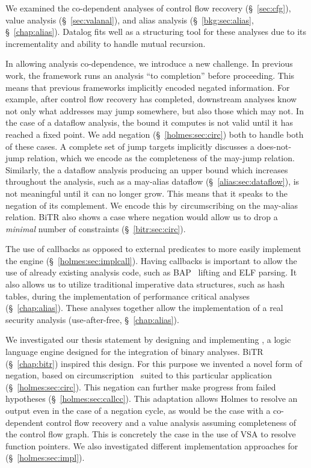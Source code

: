 We examined the co-dependent analyses of control flow recovery (\S~\ref{sec:cfg}), value analysis (\S~\ref{sec:valanal}), and alias analysis (\S~\ref{bkg:sec:alias}, \S~\ref{chap:alias}).
Datalog fits well as a structuring tool for these analyses due to its incrementality and ability to handle mutual recursion.


In allowing analysis co-dependence, we introduce a new challenge.
In previous work, the framework runs an analysis ``to completion'' before proceeding.
This means that previous frameworks implicitly encoded negated information.
For example, after control flow recovery has completed, downstream analyses know not only what addresses may jump somewhere, but also those which may not.
In the case of a dataflow analysis, the bound it computes is not valid until it has reached a fixed point.
We add negation (\S~\ref{holmes:sec:circ}) both to handle both of these cases.
A complete set of jump targets implicitly discusses a does-not-jump relation, which we encode as the completeness of the may-jump relation.
Similarly, the a dataflow analysis producing an upper bound which increases throughout the analysis, such as a may-alias dataflow (\S~\ref{alias:sec:dataflow}), is not meaningful until it can no longer grow.
This means that it speaks to the negation of its complement.
We encode this by circumscribing on the may-alias relation.
{\sc BiTR} also shows a case where negation would allow us to drop a \emph{minimal} number of constraints (\S~\ref{bitr:sec:circ}).

The use of callbacks as opposed to external predicates to more easily implement the engine (\S~\ref{holmes:sec:implcall}).
Having callbacks is important to allow the use of already existing analysis code, such as BAP~\cite{bap} lifting and ELF parsing.
It also allows us to utilize traditional imperative data structures, such as hash tables, during the implementation of performance critical analyses (\S~\ref{chap:alias}).
These analyses together allow the implementation of a real security analysis (use-after-free, \S~\ref{chap:alias}).

We investigated our thesis statement by designing and implementing \sysname, a logic language engine designed for the integration of binary analyses.
BiTR (\S~\ref{chap:bitr}) inspired this design.
For this purpose we invented a novel form of negation, based on circumscription~\cite{circumscription} suited to this particular application (\S~\ref{holmes:sec:circ}).
This negation can further make progress from failed hypotheses (\S~\ref{holmes:sec:callcc}).
This adaptation allows Holmes to resolve an output even in the case of a negation cycle, as would be the case with a co-dependent control flow recovery and a value analysis assuming completeness of the control flow graph.
This is concretely the case in the use of VSA to resolve function pointers.
We also investigated different implementation approaches for \sysname (\S~\ref{holmes:sec:impl}).

